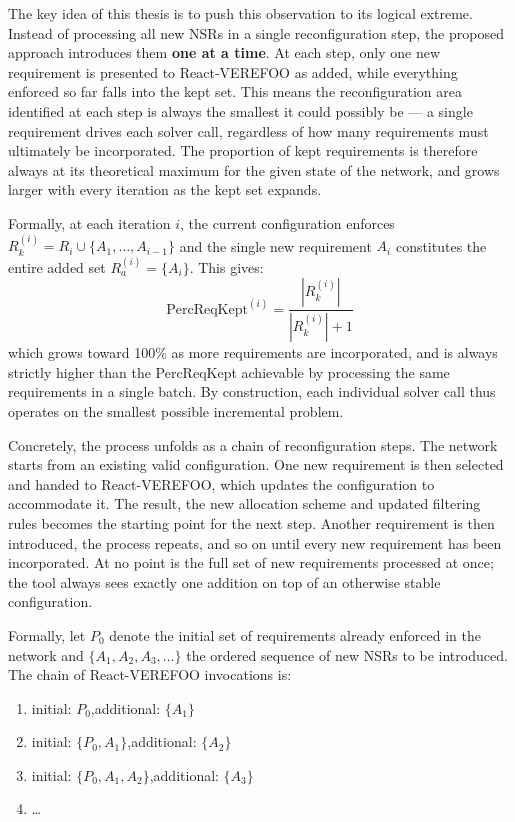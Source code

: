 The key idea of this thesis is to push this observation to its logical extreme. Instead of processing all new NSRs in a single reconfiguration step, the proposed approach introduces them \textbf{one at a time}. At each step, only one new requirement is presented to React-VEREFOO as added, while everything enforced so far falls into the kept set. This means the reconfiguration area identified at each step is always the smallest it could possibly be — a single requirement drives each solver call, regardless of how many requirements must ultimately be incorporated. The proportion of kept requirements is therefore always at its theoretical maximum for the given state of the network, and grows larger with every iteration as the kept set expands.

Formally, at each iteration $i$, the current configuration enforces $R_k^{(i)} = R_i \cup \{A_1, \ldots, A_{i-1}\}$ and the single new requirement $A_i$ constitutes the entire added set $R_a^{(i)} = \{A_i\}$. This gives:
\[
  \text{PercReqKept}^{(i)} = \frac{|R_k^{(i)}|}{|R_k^{(i)}| + 1}
\]
which grows toward 100\% as more requirements are incorporated, and is always strictly higher than the PercReqKept achievable by processing the same requirements in a single batch. By construction, each individual solver call thus operates on the smallest possible incremental problem.

Concretely, the process unfolds as a chain of reconfiguration steps. The network starts from an existing valid configuration. One new requirement is then selected and handed to React-VEREFOO, which updates the configuration to accommodate it. The result, the new allocation scheme and updated filtering rules becomes the starting point for the next step. Another requirement is then introduced, the process repeats, and so on until every new requirement has been incorporated. At no point is the full set of new requirements processed at once; the tool always sees exactly one addition on top of an otherwise stable configuration.

Formally, let $P_0$ denote the initial set of requirements already enforced in the network and $\{A_1, A_2, A_3, \ldots\}$ the ordered sequence of new NSRs to be introduced. The chain of React-VEREFOO invocations is:

\begin{enumerate}
  \item initial: $P_0$,\quad additional: $\{A_1\}$
  \item initial: $\{P_0, A_1\}$,\quad additional: $\{A_2\}$
  \item initial: $\{P_0, A_1, A_2\}$,\quad additional: $\{A_3\}$
  \item \ldots
\end{enumerate}

